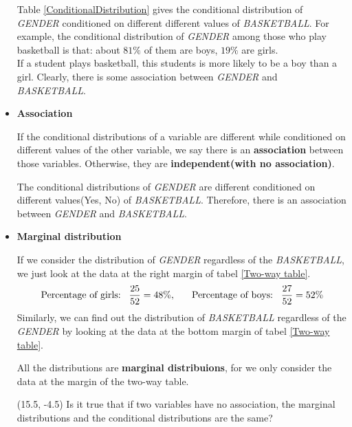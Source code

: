 \documentclass[a4paper, 12pt,twoside]{book}
\begin{document}
\begin{itemize}
Table \ref{ConditionalDistribution} gives the conditional distribution of \textit{GENDER} conditioned on different different values of \textit{BASKETBALL}. For example, the conditional distribution of \textit{GENDER} among those who play basketball is that: about $81\%$ of them are boys, $19\%$ are girls.\vspace{0.3cm}\\
If a student plays basketball, this students is more likely to be a boy than a girl. Clearly, there is some association between \textit{GENDER} and \textit{BASKETBALL}.\vspace{0.6cm}

\item \textbf{Association}\vspace{0.3cm}

If the conditional distributions of a variable are different while conditioned on different values of the other variable, we say there is an \textbf{association} between those variables. Otherwise, they   are \textbf{independent(with no association)}.\vspace{0.3cm}

The conditional distributions of \textit{GENDER} are different conditioned on different values(Yes, No) of \textit{BASKETBALL}. Therefore, there is an association between \textit{GENDER} and \textit{BASKETBALL}.
\newpage

\item \textbf{Marginal distribution}\vspace{0.3cm}

If we consider the distribution of \textit{GENDER} regardless of the \textit{BASKETBALL}, we just look at the data at the right margin of tabel \ref{Two-way table}.
$$\text{Percentage of girls:}\hspace{0.3cm}\frac{25}{52} = 48\%,\hspace{0.6cm}\text{Percentage of boys:} \hspace{0.3cm} \frac{27}{52} = 52\%$$
Similarly, we can find out the distribution of \textit{BASKETBALL} regardless of the \textit{GENDER} by looking at the data at the bottom margin of tabel \ref{Two-way table}.\vspace{0.3cm}

All the distributions are \textbf{marginal distribuions}, for we only consider the data at the margin of the two-way table.

\begin{textblock}{3}(15.5, -4.5)
Is it true that if two variables have no association, the marginal distributions and the conditional distributions are the same?
\end{textblock}
\vspace{0.6cm}


\end{itemize}
\end{document}
